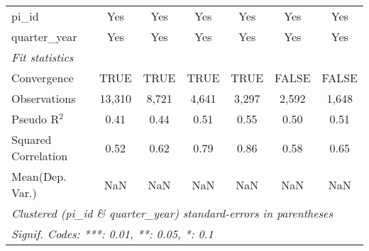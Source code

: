 \begin{tabular}{lcccccc}
   pi\_id                                                     & Yes           & Yes           & Yes           & Yes           & Yes           & Yes\\  
   quarter\_year                                              & Yes           & Yes           & Yes           & Yes           & Yes           & Yes\\  
   \midrule
   \emph{Fit statistics}\\
   Convergence                                                &TRUE           & TRUE          & TRUE          & TRUE          & FALSE         & FALSE\\  
   Observations                                               & 13,310        & 8,721         & 4,641         & 3,297         & 2,592         & 1,648\\  
   Pseudo R$^2$                                               & 0.41          & 0.44          & 0.51          & 0.55          & 0.50          & 0.51\\  
   Squared Correlation                                        & 0.52          & 0.62          & 0.79          & 0.86          & 0.58          & 0.65\\  
Mean(Dep. Var.) & NaN & NaN & NaN & NaN & NaN & NaN \\
   \midrule \midrule
   \multicolumn{7}{l}{\emph{Clustered (pi\_id \& quarter\_year) standard-errors in parentheses}}\\
   \multicolumn{7}{l}{\emph{Signif. Codes: ***: 0.01, **: 0.05, *: 0.1}}\\
\end{tabular}
\par\endgroup
